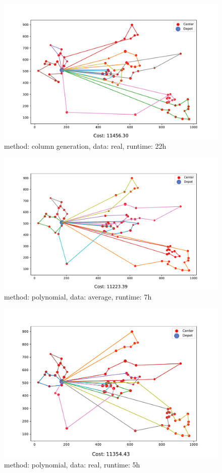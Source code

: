 \begin{figure}[tb]
    \centering
    \includegraphics[width=1\columnwidth]{figures/results_colgen_real.pdf}
    \caption{method: column generation, data: real, runtime: 22h}
  \label{fig:res-colgen-real}
\end{figure}

\begin{figure}[tb]
    \centering
    \includegraphics[width=1\columnwidth]{figures/results_poly_avg.pdf}
    \caption{method: polynomial, data: average, runtime: 7h}
  \label{fig:res-poly-avg}
\end{figure}

\begin{figure}[tb]
    \centering
    \includegraphics[width=1\columnwidth]{figures/results_poly_real.pdf}
    \caption{method: polynomial, data: real, runtime: 5h}
  \label{fig:res-poly-real}
\end{figure}
